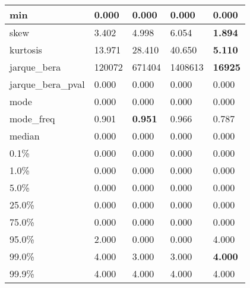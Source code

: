 \begin{table}[H]
\begin{tabular}{|l|m{10em}|m{10em}|m{10em}|m{10em}|}
\hline min & 0.000 & 0.000 & 0.000 & 0.000 \\
\hline skew & 3.402 & 4.998 & \cellcolor[rgb]{0.9, 0.54, 0.52} 6.054 & \bfseries 1.894 \\
\hline kurtosis & 13.971 & 28.410 & \cellcolor[rgb]{0.9, 0.54, 0.52} 40.650 & \bfseries 5.110 \\
\hline jarque\_bera & 120072 & 671404 & \cellcolor[rgb]{0.9, 0.54, 0.52} 1408613 & \bfseries 16925 \\
\hline jarque\_bera\_pval & 0.000 & 0.000 & 0.000 & 0.000 \\
\hline mode & 0.000 & 0.000 & 0.000 & 0.000 \\
\hline mode\_freq & 0.901 & \bfseries 0.951 & 0.966 & \cellcolor[rgb]{0.9, 0.54, 0.52} 0.787 \\
\hline median & 0.000 & 0.000 & 0.000 & 0.000 \\
\hline 0.1\% & 0.000 & 0.000 & 0.000 & 0.000 \\
\hline 1.0\% & 0.000 & 0.000 & 0.000 & 0.000 \\
\hline 5.0\% & 0.000 & 0.000 & 0.000 & 0.000 \\
\hline 25.0\% & 0.000 & 0.000 & 0.000 & 0.000 \\
\hline 75.0\% & 0.000 & 0.000 & 0.000 & 0.000 \\
\hline 95.0\% & 2.000 & 0.000 & 0.000 & 4.000 \\
\hline 99.0\% & 4.000 & \cellcolor[rgb]{0.9, 0.54, 0.52} 3.000 & \cellcolor[rgb]{0.9, 0.54, 0.52} 3.000 & \bfseries 4.000 \\
\hline 99.9\% & 4.000 & 4.000 & 4.000 & 4.000 \\
\hline
\end{tabular}
\end{table}
